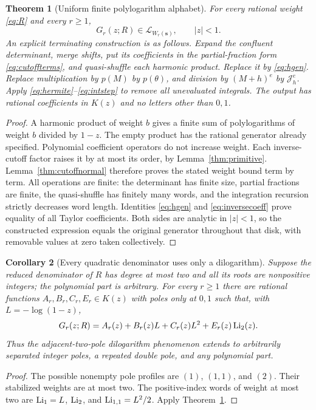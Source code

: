 \documentclass[11pt,letterpaper]{article}
\numberwithin{equation}{section}
\newtheorem{theorem}{Theorem}[section]
\newtheorem{corollary}[theorem]{Corollary}
\theoremstyle{definition}\newtheorem{definition}[theorem]{Definition}
\theoremstyle{remark}\newtheorem{remark}[theorem]{Remark}
\begin{document}
\begin{theorem}[Uniform finite polylogarithm alphabet]\label{thm:compiler}
For every rational weight \eqref{eq:R} and every $r\ge1$,
\begin{equation}\label{eq:maincompiler}
 \boxed{\displaystyle G_r(z;R)\in\mathscr L_{W_r(\mathbf s)},
                                    \qquad |z|<1.}
\end{equation}
An explicit terminating construction is as follows. Expand the
confluent determinant, merge shifts, put its coefficients in the
partial-fraction form \eqref{eq:cutoffterms}, and quasi-shuffle each
harmonic product. Replace it by \eqref{eq:hgen}. Replace multiplication
by $p(M)$ by $p(\theta)$, and division by $(M+h)^e$ by
$\mathcal J_h^e$. Apply \eqref{eq:hermite}--\eqref{eq:intstep} to remove
all unevaluated integrals. The output has rational coefficients in
$K(z)$ and no letters other than $0,1$.
\end{theorem}
\begin{proof}
A harmonic product of weight $b$ gives a finite sum of polylogarithms
of weight $b$ divided by $1-z$. The empty product has the rational
generator already specified. Polynomial coefficient operators do not
increase weight. Each inverse-cutoff factor raises it by at most its
order, by Lemma~\ref{thm:primitive}. Lemma~\ref{thm:cutoffnormal}
therefore proves the stated weight bound term by term. All operations
are finite: the determinant has finite size, partial fractions are
finite, the quasi-shuffle has finitely many words, and the integration
recursion strictly decreases word length. Identities
\eqref{eq:hgen} and \eqref{eq:inversecoeff} prove equality of all
Taylor coefficients. Both sides are analytic in $|z|<1$, so the
constructed expression equals the original generator throughout that
disk, with removable values at zero taken collectively.
\end{proof}

\begin{corollary}[Every quadratic denominator uses only a dilogarithm]
\label{thm:quadratic}
Suppose the reduced denominator of $R$ has degree at most two and
all its roots are nonpositive integers; the polynomial part is arbitrary.
For every $r\ge1$ there are rational functions $A_r,B_r,C_r,E_r\in K(z)$
with poles only at $0,1$ such that, with $L=-\log(1-z)$,
\begin{equation}\label{eq:quadratic}
       G_r(z;R)=A_r(z)+B_r(z)L+C_r(z)L^2+E_r(z)\operatorname{Li}_2(z).
\end{equation}
Thus the adjacent-two-pole dilogarithm phenomenon extends to arbitrarily
separated integer poles, a repeated double pole, and any polynomial part.
\end{corollary}
\begin{proof}
The possible nonempty pole profiles are $(1)$, $(1,1)$, and $(2)$.
Their stabilized weights are at most two. The positive-index words of
weight at most two are $\operatorname{Li}_1=L$, $\operatorname{Li}_2$, and
$\operatorname{Li}_{1,1}=L^2/2$. Apply Theorem~\ref{thm:compiler}.
\end{proof}
\end{document}
